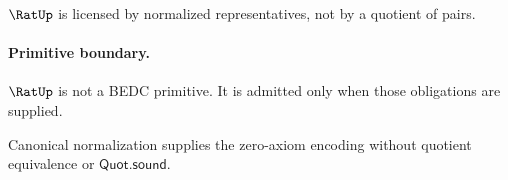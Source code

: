 \begin{corollary}
\label{cor:rat-licensed-not-primitive}
\(\RatUp\) is licensed by normalized representatives, not by a quotient of pairs.
\end{corollary}

\paragraph{Primitive boundary.}
\(\RatUp\) is not a BEDC primitive. It is admitted only when those obligations are supplied.

\begin{remark}
\label{rem:rat-zero-axiom-note}
Canonical normalization supplies the zero-axiom encoding without quotient equivalence or \(\mathsf{Quot.sound}\).
\end{remark}

